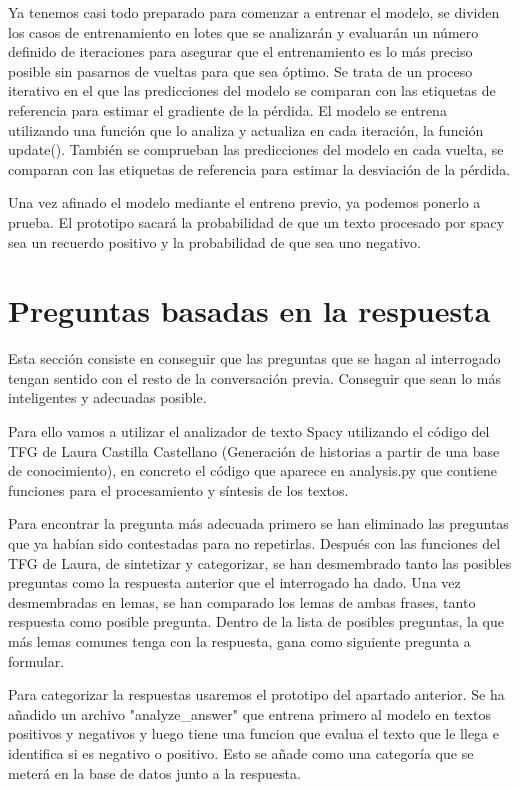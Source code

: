 Ya tenemos casi todo preparado para comenzar a entrenar el modelo, se dividen los casos de entrenamiento en lotes que se analizarán y evaluarán un número definido de iteraciones para asegurar que el entrenamiento es lo más preciso posible sin pasarnos de vueltas para que sea óptimo. Se trata de un proceso iterativo en el que las predicciones del modelo se comparan con las etiquetas de referencia para estimar el gradiente de la pérdida. El modelo se entrena utilizando una función que lo analiza y actualiza en cada iteración, la función update(). También se comprueban las predicciones del modelo en cada vuelta, se comparan con las etiquetas de referencia para estimar la desviación de la pérdida.

Una vez afinado el modelo mediante el entreno previo, ya podemos ponerlo a prueba. El prototipo sacará la probabilidad de que un texto procesado por spacy sea un recuerdo positivo y la probabilidad de que sea uno negativo. 

\section{Preguntas basadas en la respuesta}
Esta sección consiste en conseguir que las preguntas que se hagan al interrogado tengan sentido con el resto de la conversación previa. Conseguir que sean lo más inteligentes y adecuadas posible.

Para ello vamos a utilizar el analizador de texto Spacy utilizando el código del TFG de Laura Castilla Castellano (Generación de historias a partir de una base de conocimiento), en concreto el código que aparece en analysis.py que contiene funciones para el procesamiento y síntesis de los textos.

Para encontrar la pregunta más adecuada primero se han eliminado las preguntas que ya habían sido contestadas para no repetirlas. Después con las funciones del TFG de Laura, de sintetizar y categorizar, se han desmembrado tanto las posibles preguntas como la respuesta anterior que el interrogado ha dado. Una vez desmembradas en lemas, se han comparado los lemas de ambas frases, tanto respuesta como posible pregunta. Dentro de la lista de posibles preguntas, la que más lemas comunes tenga con la respuesta, gana como siguiente pregunta a formular. 

Para categorizar la respuestas usaremos el prototipo del apartado anterior. Se ha añadido un archivo "analyze_answer" que entrena primero al modelo en textos positivos y negativos y luego tiene una funcion que evalua el texto que le llega e identifica si es negativo o positivo. Esto se añade como una categoría que se meterá en la base de datos junto a la respuesta.
 
